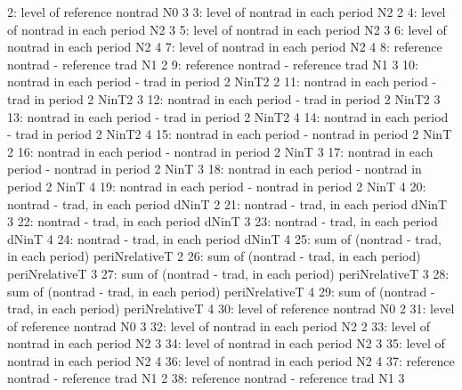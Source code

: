 \begin{Schunk}
\begin{Soutput}
 2:                   level of reference nontrad             N0      3
 3:              level of nontrad in each period             N2      2
 4:              level of nontrad in each period             N2      3
 5:              level of nontrad in each period             N2      3
 6:              level of nontrad in each period             N2      4
 7:              level of nontrad in each period             N2      4
 8:           reference nontrad - reference trad             N1      2
 9:           reference nontrad - reference trad             N1      3
10:    nontrad in each period - trad in period 2          NinT2      2
11:    nontrad in each period - trad in period 2          NinT2      3
12:    nontrad in each period - trad in period 2          NinT2      3
13:    nontrad in each period - trad in period 2          NinT2      4
14:    nontrad in each period - trad in period 2          NinT2      4
15: nontrad in each period - nontrad in period 2           NinT      2
16: nontrad in each period - nontrad in period 2           NinT      3
17: nontrad in each period - nontrad in period 2           NinT      3
18: nontrad in each period - nontrad in period 2           NinT      4
19: nontrad in each period - nontrad in period 2           NinT      4
20:               nontrad - trad, in each period          dNinT      2
21:               nontrad - trad, in each period          dNinT      3
22:               nontrad - trad, in each period          dNinT      3
23:               nontrad - trad, in each period          dNinT      4
24:               nontrad - trad, in each period          dNinT      4
25:      sum of (nontrad - trad, in each period) periNrelativeT      2
26:      sum of (nontrad - trad, in each period) periNrelativeT      3
27:      sum of (nontrad - trad, in each period) periNrelativeT      3
28:      sum of (nontrad - trad, in each period) periNrelativeT      4
29:      sum of (nontrad - trad, in each period) periNrelativeT      4
30:                   level of reference nontrad             N0      2
31:                   level of reference nontrad             N0      3
32:              level of nontrad in each period             N2      2
33:              level of nontrad in each period             N2      3
34:              level of nontrad in each period             N2      3
35:              level of nontrad in each period             N2      4
36:              level of nontrad in each period             N2      4
37:           reference nontrad - reference trad             N1      2
38:           reference nontrad - reference trad             N1      3

\end{Soutput}
\end{Schunk}
